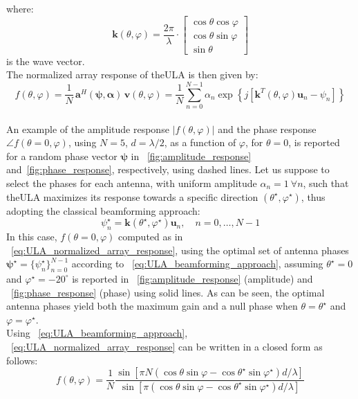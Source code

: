 where:
\begin{equation}
    \mathbf{k}(\theta, \varphi) = \frac{2\pi}{\lambda} \cdot \begin{bmatrix}
    \cos\theta \cos\varphi \\
    \cos\theta \sin\varphi \\
    \sin\theta
    \end{bmatrix}
    \label{eq:ULA_wave_vector}
\end{equation}
is the wave vector.\\
The normalized array response of the\gls{ULA} is then given by:
\begin{equation}
    f(\theta, \varphi) = \frac{1}{N} \, \mathbf{a}^H(\boldsymbol{\psi}, \boldsymbol{\alpha}) \, \mathbf{v}(\theta, \varphi)
    = \frac{1}{N} \sum_{n=0}^{N-1} \alpha_n \exp\left\{j\left[\mathbf{k}^T(\theta, \varphi)\mathbf{u}_n - \psi_n\right]\right\}
    \label{eq:ULA_normalized_array_response}
\end{equation}\\
An example of the amplitude response $|f(\theta, \varphi)|$ and the phase response
$\angle f(\theta = 0, \varphi)$, using $N = 5$, $d = \lambda/2$, as a function of $\varphi$,
for $\theta = 0$, is reported for a random phase vector $\boldsymbol{\psi}$ in
\figurename~\ref{fig:amplitude_response} and\figurename~\ref{fig:phase_response}, respectively, using dashed lines.
Let us suppose to select the phases for each antenna, with uniform amplitude $\alpha_n = 1\ \forall n$, such that the\gls{ULA} maximizes its response towards a specific direction $(\theta^\star, \varphi^\star)$, thus adopting the classical beamforming approach:
\begin{equation}
    \psi^\star_n = \mathbf{k}(\theta^\star, \varphi^\star) \mathbf{u}_n, \quad n = 0, \ldots, N-1
    \label{eq:ULA_beamforming_approach}
\end{equation}
In this case, $f(\theta = 0, \varphi)$ computed as in \equationname~\ref{eq:ULA_normalized_array_response}, using the optimal set of antenna phases $\boldsymbol{\psi}^\star = \{\psi^\star_n\}_{n=0}^{N-1}$ according to \equationname~\ref{eq:ULA_beamforming_approach}, assuming $\theta^\star = 0$ and $\varphi^\star = -20^\circ$ is reported in \figurename~\ref{fig:amplitude_response} (amplitude) and \figurename~\ref{fig:phase_response} (phase) using solid lines. As can be seen, the optimal antenna phases yield both the maximum gain and a null phase when $\theta = \theta^\star$ and $\varphi = \varphi^\star$.\\
Using \equationname~\eqref{eq:ULA_beamforming_approach}, \equationname~\eqref{eq:ULA_normalized_array_response} can be written in a closed form as follows:
\begin{equation}
f(\theta, \varphi) = \frac{1}{N}
\frac{\sin \left[ \pi N (\cos\theta \sin\varphi - \cos\theta^\star \sin\varphi^\star) d/\lambda \right]}
{\sin \left[ \pi (\cos\theta \sin\varphi - \cos\theta^\star \sin\varphi^\star) d/\lambda \right]}
\end{equation}


